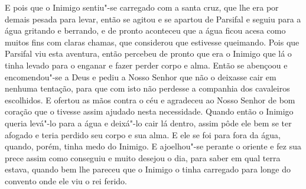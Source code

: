 E pois que o Inimigo sentiu"-se carregado com a santa cruz, que lhe era por
demais pesada para levar, então se agitou e se apartou de Parsifal e seguiu
para a água gritando e berrando, e de pronto aconteceu que a água ficou acesa
como muitos fins com claras chamas, que considerou que estivesse queimando. 
Pois que Parsifal viu esta aventura, então percebeu de
pronto que era o Inimigo que lá o tinha levado para o enganar e fazer perder
corpo e alma. Então se abençoou e encomendou"-se a Deus e pediu a Nosso Senhor
que não o deixasse cair em nenhuma tentação, para que com isto não perdesse a
companhia dos cavaleiros escolhidos. E ofertou as mãos contra o céu e agradeceu
ao Nosso Senhor de bom coração que o tivesse assim ajudado nesta necessidade.
Quando então o Inimigo queria levá"-lo para a água e deixá"-lo cair lá dentro,
assim pôde ele bem se ter afogado e teria perdido seu corpo e sua alma. E ele
se foi para fora da água, quando, porém, tinha medo do Inimigo. E ajoelhou"-se
perante o oriente e fez sua prece assim como conseguiu e muito desejou o dia,
para saber em qual terra estava, quando bem lhe pareceu que o Inimigo o tinha
carregado para longe do convento onde ele viu o rei ferido. 

